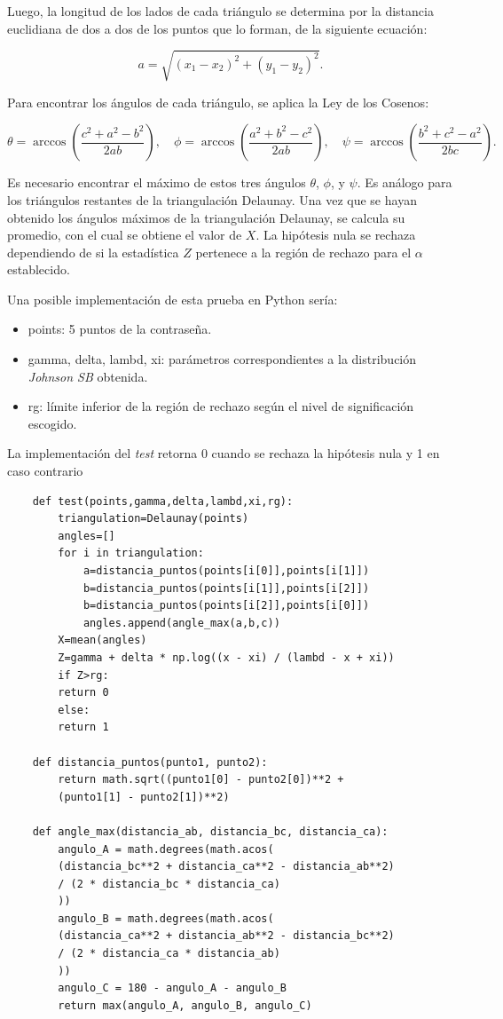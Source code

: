 \documentclass[12pt]{report}
\begin{document}
Luego, la longitud de los lados de cada triángulo se determina por la distancia euclidiana de dos a dos de los puntos que lo forman, de la siguiente ecuación:

\[
a = \sqrt{(x_{1} - x_{2})^2 + (y_{1} - y_{2})^2} .
\]

Para encontrar los ángulos de cada triángulo, se aplica la Ley de los Cosenos:

\[
\theta = \arccos\left(\frac{c^2 + a^2 - b^2}{2ab}\right), \quad \phi = \arccos\left(\frac{a^2 + b^2 - c^2}{2ab}\right), \quad \psi = \arccos\left(\frac{b^2 + c^2 - a^2}{2bc}\right).
\]

Es necesario encontrar el máximo de estos tres ángulos \(\theta\), \(\phi\), y \(\psi\). Es análogo para los triángulos restantes de la triangulación Delaunay. Una vez que se hayan obtenido los ángulos máximos de la triangulación Delaunay, se calcula su promedio, con el cual se obtiene el valor de  \(X\). La hipótesis nula se rechaza dependiendo de si la estadística \(Z\) pertenece a la región de rechazo para el \(\alpha\) establecido.

Una posible implementación de esta prueba en Python sería:
\begin{itemize}
	\item points: 5 puntos de la contraseña. 
	\item gamma, delta, lambd, xi: parámetros correspondientes a la distribución \textit{Johnson SB} obtenida.
	\item rg: límite inferior de la región de rechazo según el nivel de significación escogido.
	
\end{itemize}
La implementación del \textit{test} retorna 0 cuando se rechaza la hipótesis nula y 1 en caso contrario



\begin{lstlisting}
	def test(points,gamma,delta,lambd,xi,rg):
		triangulation=Delaunay(points)
		angles=[]
		for i in triangulation:
			a=distancia_puntos(points[i[0]],points[i[1]])
			b=distancia_puntos(points[i[1]],points[i[2]])
			b=distancia_puntos(points[i[2]],points[i[0]])
			angles.append(angle_max(a,b,c))
		X=mean(angles)
		Z=gamma + delta * np.log((x - xi) / (lambd - x + xi))
		if Z>rg:
		return 0
		else:
		return 1
	
	def distancia_puntos(punto1, punto2):
		return math.sqrt((punto1[0] - punto2[0])**2 +
		(punto1[1] - punto2[1])**2)
	
	def angle_max(distancia_ab, distancia_bc, distancia_ca):
		angulo_A = math.degrees(math.acos(
		(distancia_bc**2 + distancia_ca**2 - distancia_ab**2) 
		/ (2 * distancia_bc * distancia_ca)
		))
		angulo_B = math.degrees(math.acos(
		(distancia_ca**2 + distancia_ab**2 - distancia_bc**2) 
		/ (2 * distancia_ca * distancia_ab)
		))
		angulo_C = 180 - angulo_A - angulo_B  
		return max(angulo_A, angulo_B, angulo_C)
\end{lstlisting}
\end{document}
